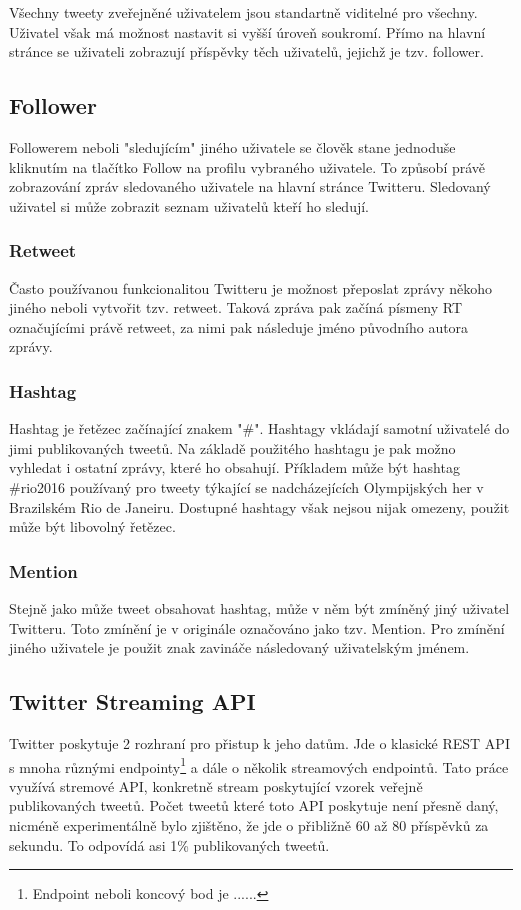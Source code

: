 \documentclass[thesis=B,czech]{FITthesis}[2012/06/26]
\begin{document}
Všechny tweety zveřejněné uživatelem jsou standartně viditelné pro všechny. Uživatel však má možnost nastavit si vyšší úroveň soukromí. Přímo na hlavní stránce se uživateli zobrazují příspěvky těch uživatelů, jejichž je tzv. follower. 

\subsection{Follower}

	Followerem neboli "sledujícím" jiného uživatele se člověk stane jednoduše kliknutím na tlačítko Follow na profilu vybraného uživatele. To způsobí právě zobrazování zpráv sledovaného uživatele na hlavní stránce Twitteru. Sledovaný uživatel si může zobrazit seznam uživatelů kteří ho sledují. 


\subsubsection{Retweet}

	Často používanou funkcionalitou Twitteru je možnost přeposlat zprávy někoho jiného neboli vytvořit tzv. retweet. Taková zpráva pak začíná písmeny RT označujícími právě retweet, za nimi pak následuje jméno původního autora zprávy. 


\subsubsection{Hashtag}

	Hashtag je řetězec začínající znakem "\#". Hashtagy vkládají samotní uživatelé do jimi publikovaných tweetů. Na základě použitého hashtagu je pak možno vyhledat i ostatní zprávy, které ho obsahují. Příkladem může být hashtag \#rio2016 používaný pro tweety týkající se nadcházejících Olympijských her v Brazilském Rio de Janeiru. Dostupné hashtagy však nejsou nijak omezeny, použit může být libovolný řetězec. 


\subsubsection{Mention}

	Stejně jako může tweet obsahovat hashtag, může v něm být zmíněný jiný uživatel Twitteru. Toto zmínění je v originále označováno jako tzv. Mention. Pro zmínění jiného uživatele je použit znak zavináče následovaný uživatelským jménem. 


\subsection{Twitter Streaming API}
\label{twitter-api}
	Twitter poskytuje 2 rozhraní pro přistup k jeho datům. Jde o klasické REST API s mnoha různými endpointy\footnote{Endpoint neboli koncový bod je ......} a dále o několik streamových endpointů. Tato práce využívá stremové API, konkretně stream poskytující vzorek veřejně publikovaných tweetů\cite{twitter-api}. Počet tweetů které toto API poskytuje není přesně daný, nicméně experimentálně bylo zjištěno, že jde o přibližně 60 až 80 příspěvků za sekundu. To odpovídá asi 1\% publikovaných tweetů. 
	
\end{document}
